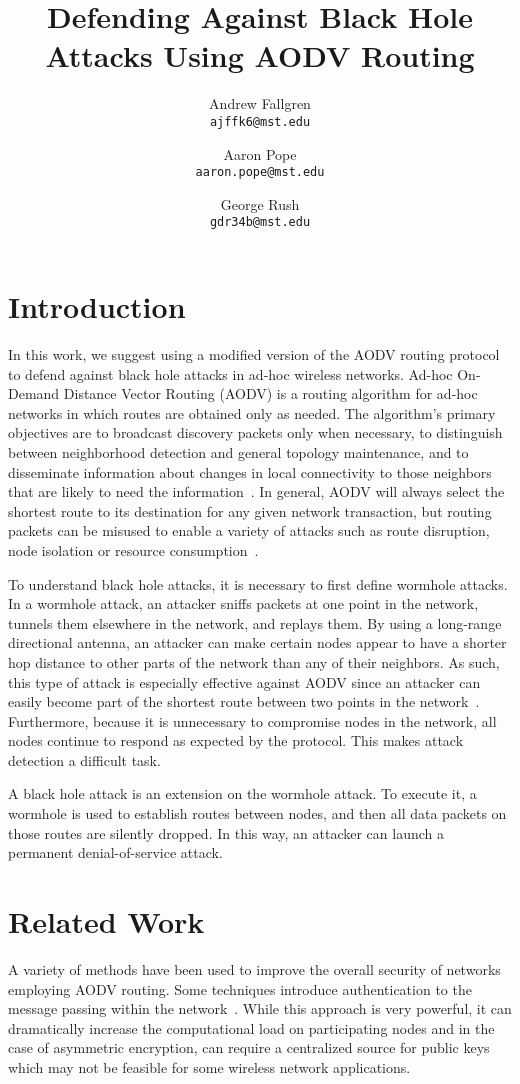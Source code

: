\documentclass[12pt,a4paper]{report}
\author{
    Andrew Fallgren \\
    \texttt{ajffk6@mst.edu}
    \and
    Aaron Pope \\
    \texttt{aaron.pope@mst.edu}
    \and
    George Rush \\
    \texttt{gdr34b@mst.edu}
}
\title{Defending Against Black Hole Attacks Using AODV Routing}
\begin{document}
\maketitle

\pagebreak
\section{Introduction}
In this work, we suggest using a modified version of the AODV routing protocol to defend against black hole attacks in ad-hoc wireless networks. Ad-hoc On-Demand Distance Vector Routing (AODV) is a routing algorithm for ad-hoc networks in which routes are obtained only as needed. The algorithm's primary objectives are to broadcast discovery packets only when necessary, to distinguish between neighborhood detection and general topology maintenance, and to disseminate information about changes in local connectivity to those neighbors that are likely to need the information~\cite{749281}. In general, AODV will always select the shortest route to its destination for any given network transaction, but routing packets can be misused to enable a variety of attacks such as route disruption, node isolation or resource consumption~\cite{Ning2005795}.

To understand black hole attacks, it is necessary to first define wormhole attacks. In a wormhole attack, an attacker sniffs packets at one point in the network, tunnels them elsewhere in the network, and replays them. By using a long-range directional antenna, an attacker can make certain nodes appear to have a shorter hop distance to other parts of the network than any of their neighbors. As such, this type of attack is especially effective against AODV since an attacker can easily become part of the shortest route between two points in the network~\cite{1589115}. Furthermore, because it is unnecessary to compromise nodes in the network, all nodes continue to respond as expected by the protocol. This makes attack detection a difficult task.

A black hole attack is an extension on the wormhole attack. To execute it, a wormhole is used to establish routes between nodes, and then all data packets on those routes are silently dropped. In this way, an attacker can launch a permanent denial-of-service attack.

\section{Related Work}
A variety of methods have been used to improve the overall security of networks employing AODV routing. Some techniques introduce authentication to the message passing within the network~\cite{Hu:2005:ASO:1160100.1160103, 1181388, 806983}. While this approach is very powerful, it can dramatically increase the computational load on participating nodes and in the case of asymmetric encryption, can require a centralized source for public keys which may not be feasible for some wireless network applications.
\end{document}
